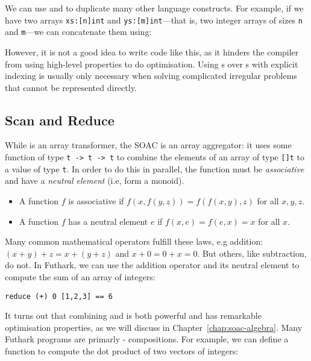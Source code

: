 \documentclass[oneside,11pt]{book}
\begin{document}
We can use  and  to duplicate many other
language constructs.  For example, if we have two arrays
\texttt{xs:[n]int} and \texttt{ys:[m]int}---that is, two integer
arrays of sizes \texttt{n} and \texttt{m}---we can concatenate them
using:



However, it is not a good idea to write code like this, as it hinders
the compiler from using high-level properties to do optimisation.
Using s over s with explicit indexing is
usually only necessary when solving complicated irregular problems
that cannot be represented directly.

\subsection{Scan and Reduce}

While  is an array transformer, the  SOAC
is an array aggregator: it uses some function of type \texttt{t -> t
  -> t} to combine the elements of an array of type \texttt{[]t} to a
value of type \texttt{t}.  In order to do this in parallel, the
function must be \textit{associative} and have a \textit{neutral
  element} (i.e, form a monoid).

\begin{itemize}
\item A function $f$ is associative if $f(x,f(y,z)) = f(f(x,y),z)$ for
  all $x,y,z$.
\item A function $f$ has a neutral element $e$ if
  $f(x,e) = f(e,x) = x$ for all $x$.
\end{itemize}

Many common mathematical operators fulfill these laws, e.g addition:
$(x+y)+z=x+(y+z)$ and $x+0=0+x=0$.  But others, like subtraction, do
not.  In Futhark, we can use the addition operator and its neutral
element to compute the sum of an array of integers:

\begin{lstlisting}
reduce (+) 0 [1,2,3] == 6
\end{lstlisting}

It turns out that combining  and  is both
powerful and has remarkable optimisation properties, as we will
discuss in Chapter~\ref{chap:soac-algebra}.  Many Futhark programs are
primarly - compositions.  For example, we
can define a function to compute the dot product of two vectors of
integers:
\end{document}
